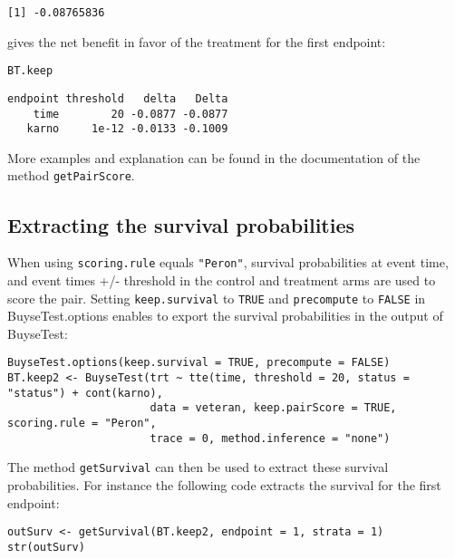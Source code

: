 \documentclass[12pt]{article}
\begin{document}
\begin{verbatim}
[1] -0.08765836
\end{verbatim}

gives the net benefit in favor of the treatment for the first
endpoint:
\lstset{language=r,label= ,caption= ,captionpos=b,numbers=none}
\begin{lstlisting}
BT.keep
\end{lstlisting}

\begin{verbatim}
endpoint threshold   delta   Delta
    time        20 -0.0877 -0.0877
   karno     1e-12 -0.0133 -0.1009
\end{verbatim}

More examples and explanation can be found in the documentation of
the method \texttt{getPairScore}.

\subsection{Extracting the survival probabilities}
\label{sec:orgaa3ab90}
When using \texttt{scoring.rule} equals \texttt{"Peron"}, survival probabilities at
event time, and event times +/- threshold in the control and treatment
arms are used to score the pair. Setting \texttt{keep.survival} to \texttt{TRUE} and
\texttt{precompute} to \texttt{FALSE} in BuyseTest.options enables to export the
survival probabilities in the output of BuyseTest:
\lstset{language=r,label= ,caption= ,captionpos=b,numbers=none}
\begin{lstlisting}
BuyseTest.options(keep.survival = TRUE, precompute = FALSE)
BT.keep2 <- BuyseTest(trt ~ tte(time, threshold = 20, status = "status") + cont(karno),
					  data = veteran, keep.pairScore = TRUE, scoring.rule = "Peron",
					  trace = 0, method.inference = "none")
\end{lstlisting}

The method \texttt{getSurvival} can then be used to extract these survival
probabilities. For instance the following code extracts the survival
for the first endpoint:
\lstset{language=r,label= ,caption= ,captionpos=b,numbers=none}
\begin{lstlisting}
outSurv <- getSurvival(BT.keep2, endpoint = 1, strata = 1)
str(outSurv)
\end{lstlisting}
\end{document}
